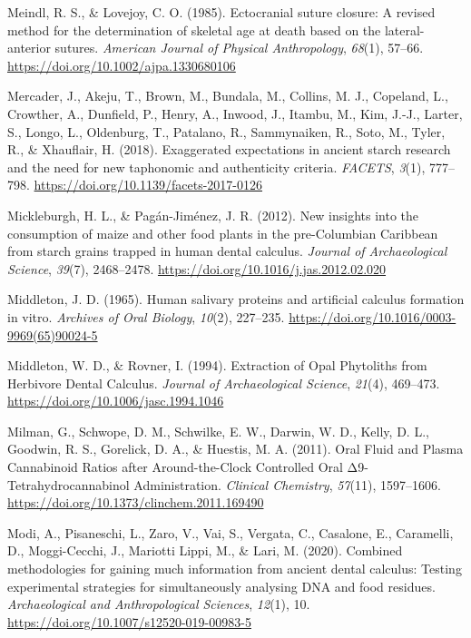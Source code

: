 \documentclass[
  letterpaper,
]{book}
\newlength{\cslhangindent}
\newlength{\cslentryspacingunit} %
\newenvironment{CSLReferences}[2] %
 {%
  \setlength{\parindent}{0pt}
  \ifodd #1
  \let\oldpar\par
  \def\par{\hangindent=\cslhangindent\oldpar}
  \fi
  \setlength{\parskip}{#2\cslentryspacingunit}
 }%
 {}
\begin{document}
\begin{CSLReferences}{1}{0}
\leavevmode{}%
Meindl, R. S., \& Lovejoy, C. O. (1985). Ectocranial suture closure: {A}
revised method for the determination of skeletal age at death based on
the lateral-anterior sutures. \emph{American Journal of Physical
Anthropology}, \emph{68}(1), 57--66.
\url{https://doi.org/10.1002/ajpa.1330680106}

\leavevmode{}%
Mercader, J., Akeju, T., Brown, M., Bundala, M., Collins, M. J.,
Copeland, L., Crowther, A., Dunfield, P., Henry, A., Inwood, J., Itambu,
M., Kim, J.-J., Larter, S., Longo, L., Oldenburg, T., Patalano, R.,
Sammynaiken, R., Soto, M., Tyler, R., \& Xhauflair, H. (2018).
Exaggerated expectations in ancient starch research and the need for new
taphonomic and authenticity criteria. \emph{FACETS}, \emph{3}(1),
777--798. \url{https://doi.org/10.1139/facets-2017-0126}

\leavevmode{}%
Mickleburgh, H. L., \& Pagán-Jiménez, J. R. (2012). New insights into
the consumption of maize and other food plants in the pre-{Columbian
Caribbean} from starch grains trapped in human dental calculus.
\emph{Journal of Archaeological Science}, \emph{39}(7), 2468--2478.
\url{https://doi.org/10.1016/j.jas.2012.02.020}

\leavevmode{}%
Middleton, J. D. (1965). Human salivary proteins and artificial calculus
formation in vitro. \emph{Archives of Oral Biology}, \emph{10}(2),
227--235. \url{https://doi.org/10.1016/0003-9969(65)90024-5}

\leavevmode{}%
Middleton, W. D., \& Rovner, I. (1994). Extraction of {Opal Phytoliths}
from {Herbivore Dental Calculus}. \emph{Journal of Archaeological
Science}, \emph{21}(4), 469--473.
\url{https://doi.org/10.1006/jasc.1994.1046}

\leavevmode{}%
Milman, G., Schwope, D. M., Schwilke, E. W., Darwin, W. D., Kelly, D.
L., Goodwin, R. S., Gorelick, D. A., \& Huestis, M. A. (2011). Oral
{Fluid} and {Plasma Cannabinoid Ratios} after {Around-the-Clock
Controlled Oral Δ9-Tetrahydrocannabinol Administration}. \emph{Clinical
Chemistry}, \emph{57}(11), 1597--1606.
\url{https://doi.org/10.1373/clinchem.2011.169490}

\leavevmode{}%
Modi, A., Pisaneschi, L., Zaro, V., Vai, S., Vergata, C., Casalone, E.,
Caramelli, D., Moggi-Cecchi, J., Mariotti Lippi, M., \& Lari, M. (2020).
Combined methodologies for gaining much information from ancient dental
calculus: Testing experimental strategies for simultaneously analysing
{DNA} and food residues. \emph{Archaeological and Anthropological
Sciences}, \emph{12}(1), 10.
\url{https://doi.org/10.1007/s12520-019-00983-5}


\end{CSLReferences}
\end{document}
